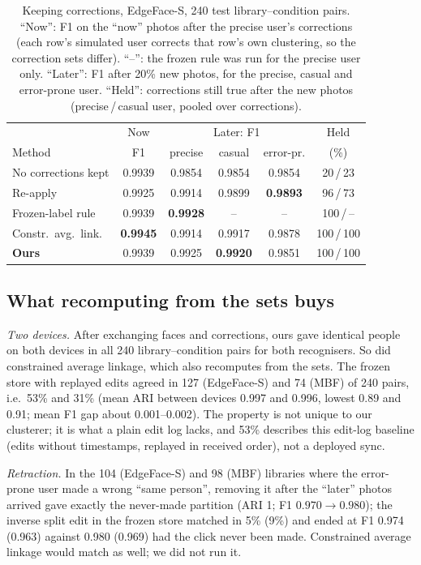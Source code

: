 \documentclass[conference]{IEEEtran}
\begin{document}
\begin{table}[t]
\caption{Keeping corrections, EdgeFace-S, 240 test library--condition pairs. ``Now'': F1 on the ``now'' photos after the precise user's
corrections (each row's simulated user corrects that row's own clustering, so the correction sets differ). ``--'': the frozen rule was run for the precise user only. ``Later'': F1 after 20\% new photos, for the precise, casual and error-prone user. ``Held'': corrections
still true after the new photos (precise\,/\,casual user, pooled over corrections).}
\label{tab:corr}
\centering\footnotesize
\setlength{\tabcolsep}{1.8pt}
\begin{tabular}{lccccc}
\toprule
 & Now & \multicolumn{3}{c}{Later: F1} & Held \\
Method & F1 & precise & casual & error-pr. & (\%) \\
\midrule
No corrections kept  & 0.9939 & 0.9854 & 0.9854 & 0.9854 & 20\,/\,23 \\
Re-apply & 0.9925 & 0.9914 & 0.9899 & \textbf{0.9893} & 96\,/\,73 \\
Frozen-label rule & 0.9939 & \textbf{0.9928} & -- & -- & 100\,/\,-- \\
Constr.\ avg.\ link. & \textbf{0.9945} & 0.9914 & 0.9917 & 0.9878 & 100\,/\,100 \\
\textbf{Ours}        & 0.9939 & 0.9925 & \textbf{0.9920} & 0.9851 & 100\,/\,100 \\
\bottomrule
\end{tabular}
\end{table}

\subsection{What recomputing from the sets buys}\label{sec:conseq}
\emph{Two devices.} After exchanging faces and corrections, ours gave identical people on both devices in all 240
library--condition pairs for both recognisers. So did constrained average linkage, which also recomputes from the sets. The
frozen store with replayed edits agreed in 127 (EdgeFace-S) and 74 (MBF) of 240 pairs, i.e.\ 53\% and 31\% (mean ARI between devices 0.997 and 0.996, lowest 0.89 and 0.91; mean F1 gap about 0.001--0.002). The property
is not unique to our clusterer; it is what a plain edit log lacks, and 53\% describes this edit-log baseline (edits without
timestamps, replayed in received order), not a deployed sync.

\emph{Retraction.} In the 104 (EdgeFace-S) and 98 (MBF) libraries where the error-prone user made a wrong ``same person'',
removing it after the ``later'' photos arrived gave exactly the never-made partition (ARI 1; F1 $0.970\to0.980$); the inverse split
edit in the frozen store matched in 5\% (9\%) and ended at F1 0.974 (0.963) against 0.980 (0.969) had the click never been made. Constrained average linkage would match as well; we did not run it.
\end{document}
